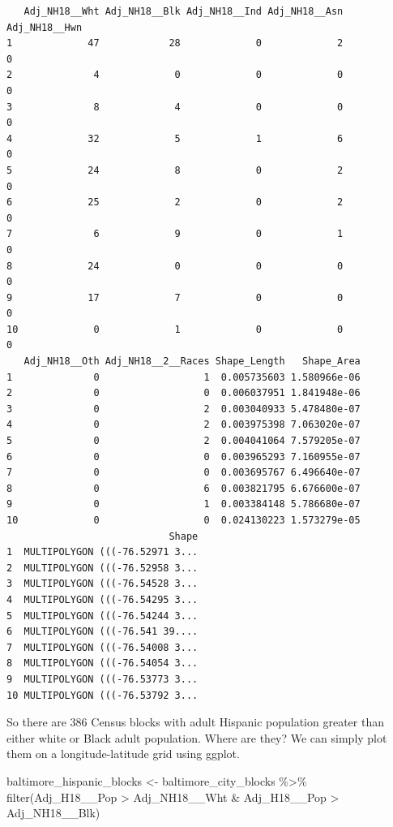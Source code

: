 \documentclass[
  letterpaper,
  DIV=11,
  numbers=noendperiod]{scrreprt}
\newenvironment{Shaded}{\begin{snugshade}}{\end{snugshade}}
\newcommand{\FunctionTok}[1]{\textcolor[rgb]{0.28,0.35,0.67}{#1}}
\newcommand{\NormalTok}[1]{\textcolor[rgb]{0.00,0.23,0.31}{#1}}
\newcommand{\OtherTok}[1]{\textcolor[rgb]{0.00,0.23,0.31}{#1}}
\newcommand{\SpecialCharTok}[1]{\textcolor[rgb]{0.37,0.37,0.37}{#1}}
\begin{document}
\begin{verbatim}
   Adj_NH18__Wht Adj_NH18__Blk Adj_NH18__Ind Adj_NH18__Asn Adj_NH18__Hwn
1             47            28             0             2             0
2              4             0             0             0             0
3              8             4             0             0             0
4             32             5             1             6             0
5             24             8             0             2             0
6             25             2             0             2             0
7              6             9             0             1             0
8             24             0             0             0             0
9             17             7             0             0             0
10             0             1             0             0             0
   Adj_NH18__Oth Adj_NH18__2__Races Shape_Length   Shape_Area
1              0                  1  0.005735603 1.580966e-06
2              0                  0  0.006037951 1.841948e-06
3              0                  2  0.003040933 5.478480e-07
4              0                  2  0.003975398 7.063020e-07
5              0                  2  0.004041064 7.579205e-07
6              0                  0  0.003965293 7.160955e-07
7              0                  0  0.003695767 6.496640e-07
8              0                  6  0.003821795 6.676600e-07
9              0                  1  0.003384148 5.786680e-07
10             0                  0  0.024130223 1.573279e-05
                            Shape
1  MULTIPOLYGON (((-76.52971 3...
2  MULTIPOLYGON (((-76.52958 3...
3  MULTIPOLYGON (((-76.54528 3...
4  MULTIPOLYGON (((-76.54295 3...
5  MULTIPOLYGON (((-76.54244 3...
6  MULTIPOLYGON (((-76.541 39....
7  MULTIPOLYGON (((-76.54008 3...
8  MULTIPOLYGON (((-76.54054 3...
9  MULTIPOLYGON (((-76.53773 3...
10 MULTIPOLYGON (((-76.53792 3...
\end{verbatim}

So there are 386 Census blocks with adult Hispanic population greater
than either white or Black adult population. Where are they? We can
simply plot them on a longitude-latitude grid using ggplot.

\begin{Shaded}
\begin{Highlighting}[]
\NormalTok{baltimore\_hispanic\_blocks }\OtherTok{\textless{}{-}}\NormalTok{ baltimore\_city\_blocks }\SpecialCharTok{\%\textgreater{}\%}
  \FunctionTok{filter}\NormalTok{(Adj\_H18\_\_Pop }\SpecialCharTok{\textgreater{}}\NormalTok{ Adj\_NH18\_\_Wht }\SpecialCharTok{\&}\NormalTok{ Adj\_H18\_\_Pop }\SpecialCharTok{\textgreater{}}\NormalTok{ Adj\_NH18\_\_Blk)}
\end{Highlighting}
\end{Shaded}
\end{document}
